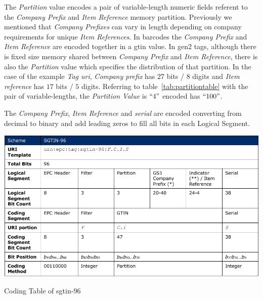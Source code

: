 The \emph{Partition} value encodes a pair of variable-length numeric fields referent to the \emph{Company Prefix} and \emph{Item Reference} memory partition. Previously we mentioned that \emph{Company Prefixes} can vary in length depending on company requirements for unique \emph{Item References}. 
In barcodes the \emph{Company Prefix} and \emph{Item Reference} are encoded together in a \ac{gtin} value. 
In \ac{gen2} tags, although there is fixed size memory shared between \emph{Company Prefix} and \emph{Item Reference}, there is also the \emph{Partition} value which specifies the distribution of that partition.
In the case of the example \emph{Tag \ac{uri}}, \emph{Company prefix} has $27$ bits / $8$ digits and \emph{Item reference} has $17$ bits / $5$ digits. Referring to table~\ref{tab:partitiontable} with the pair of variable-lengths, the \emph{Partition Value} is $``4"$ encoded has $``100"$.

The \emph{Company Prefix}, \emph{Item Reference} and \emph{serial} are encoded converting from decimal to binary and add leading zeros to fill all bits in each Logical Segment.

\begin{table}[]
    \centering
    \includegraphics[width=\textwidth]{./figs/02-state-of-the-art/table_codingtable.pdf}
    \caption{Coding Table of \ac{sgtin}-$96$~\cite{EPCTagData}} 
    \label{tab:sgtin96codingtable}
\end{table}

